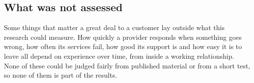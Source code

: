 \subsection*{What was not assessed}

Some things that matter a great deal to a customer lay outside what this research
could measure. How quickly a provider responds when something goes wrong, how often
its services fail, how good its support is and how easy it is to leave all depend
on experience over time, from inside a working relationship. None of these could be
judged fairly from published material or from a short test, so none of them is part
of the results.
